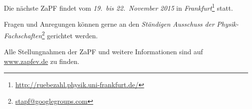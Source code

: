 \vspace{0.5cm}
Die nächste ZaPF findet vom \emph{19.\ bis 22.\ November 2015} in \emph{Frankfurt}\footnote{\href{http://ruebezahl.physik.uni-frankfurt.de/}{\url{http://ruebezahl.physik.uni-frankfurt.de/}}} statt.

Fragen und Anregungen können gerne an den \emph{Ständigen Ausschuss der Physik-Fachschaften}\footnote{\href{mailto:stapf@googlegroups.com}{\url{stapf@googlegroups.com}}} gerichtet werden.

Alle Stellungnahmen der ZaPF und weitere Informationen sind auf \href{http://www.zapfev.de}{\url{www.zapfev.de}} zu finden.
